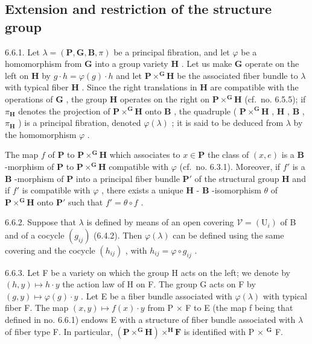 \subsection{Extension and restriction of the structure group}

6.6.1. Let \(\lambda = (\mathbf{P}, \mathbf{G}, \mathbf{B}, \pi)\) be a principal fibration, and let \(\varphi\) be a homomorphism from \(\mathbf{G}\) into a group variety \(\mathbf{H}\) . Let us make \(\mathbf{G}\) operate on the left on \(\mathbf{H}\) by \(g \cdot h = \varphi(g) \cdot h\) and let \(\mathbf{P} \times^{\mathbf{G}} \mathbf{H}\) be the associated fiber bundle to \(\lambda\) with typical fiber \(\mathbf{H}\) . Since the right translations in \(\mathbf{H}\) are compatible with the operations of \(\mathbf{G}\) , the group \(\mathbf{H}\) operates on the right on \(\mathbf{P} \times^{\mathbf{G}} \mathbf{H}\) (cf.~no. 6.5.5); if \(\pi_{\mathbf{H}}\) denotes the projection of \(\mathbf{P} \times^{\mathbf{G}} \mathbf{H}\) onto \(\mathbf{B}\) , the quadruple ( \(\mathbf{P} \times^{\mathbf{G}} \mathbf{H}\) , \(\mathbf{H}\) , \(\mathbf{B}\) , \(\pi_{\mathbf{H}}\) ) is a principal fibration, denoted \(\varphi(\lambda)\) ; it is said to be deduced from \(\lambda\) by the homomorphism \(\varphi\) .

The map \(f\) of \(\mathbf{P}\) to \(\mathbf{P} \times^{\mathbf{G}}\mathbf{H}\) which associates to \(x \in \mathbf{P}\) the class of \((x, e)\) is a \(\mathbf{B}\) -morphism of \(\mathbf{P}\) to \(\mathbf{P} \times^{\mathbf{G}}\mathbf{H}\) compatible with \(\varphi\) (cf.~no. 6.3.1). Moreover, if \(f'\) is a \(\mathbf{B}\) -morphism of \(\mathbf{P}\) into a principal fiber bundle \(\mathbf{P}'\) of the structural group \(\mathbf{H}\) and if \(f'\) is compatible with \(\varphi\) , there exists a unique \(\mathbf{H}\) - \(\mathbf{B}\) -isomorphism \(\theta\) of \(\mathbf{P} \times^{\mathbf{G}}\mathbf{H}\) onto \(\mathbf{P}'\) such that \(f' = \theta \circ f\) .

6.6.2. Suppose that \(\lambda\) is defined by means of an open covering \(\mathcal{V} = (\mathrm{U}_i)\) of B and of a cocycle \((g_{ij})\) (6.4.2). Then \(\varphi(\lambda)\) can be defined using the same covering and the cocycle \((h_{ij})\) , with \(h_{ij} = \varphi \circ g_{ij}\) .

6.6.3. Let F be a variety on which the group H acts on the left; we denote by \((h, y) \mapsto h \cdot y\) the action law of H on F. The group G acts on F by \((g, y) \mapsto \varphi(g) \cdot y\) . Let E be a fiber bundle associated with \(\varphi(\lambda)\) with typical fiber F. The map \((x, y) \mapsto f(x) \cdot y\) from P × F to E (the map f being that defined in no. 6.6.1) endows E with a structure of fiber bundle associated with \(\lambda\) of fiber type F. In particular, \((\mathbf{P} \times^{\mathbf{G}}\mathbf{H}) \times^{\mathbf{H}}\mathbf{F}\) is identified with P × \(^{\mathbf{G}}\) F.

